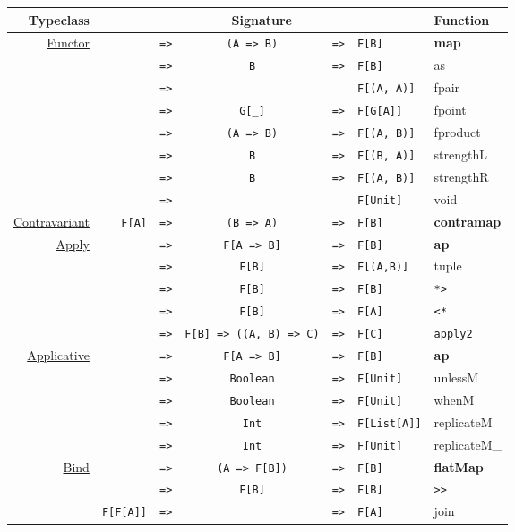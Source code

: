 \documentclass{tufte-handout}
\newcommand{\fa}{F[A]}
\newcommand{\fb}{F[B]}
\newcommand{\rarr}{\texttt{=>}}
\newcommand{\fTwo}[2]{\texttt{#1} & \rarr & & & \texttt{#2}}
\newcommand{\fThree}[3]{\texttt{#1} & \rarr & \texttt{#2} & \rarr & \texttt{#3}}
\newcommand{\sdocUrl}[1]{http://docs.typelevel.org/api/scalaz/stable/7.0.4/doc/\#scalaz.#1}
\newcommand{\sdocHref}[1]{\href{\sdocUrl{#1}}{#1}}
\begin{document}
\begin{table}[ht]
  \centering
  \selectfont
  \begin{tabular}{rrcclll}
    Typeclass & \multicolumn{5}{c}{Signature} & Function \\
    \midrule
    \multirow{8}{*}{\sdocHref{Functor}}
      & \fThree{\multirow{8}{*}{\fa}}{(A => B)}{\fb} & \textbf{map} \\
      & \fThree{}{B}{\fb} & as \\
      & \fTwo{}{F[(A, A)]} & fpair \\
      & \fThree{}{G[\_]}{F[G[A]]} & fpoint \\
      & \fThree{}{(A => B)}{F[(A, B)]} & fproduct \\
      & \fThree{}{B}{F[(B, A)]} & strengthL \\
      & \fThree{}{B}{F[(A, B)]} & strengthR \\
      & \fTwo{}{F[Unit]} & void \\[.5cm]
    \sdocHref{Contravariant} & \fThree{\fa}{(B => A)}{\fb} & \textbf{contramap} \\[.5cm]
    \multirow{5}{*}{\sdocHref{Apply}\footnotemark}
      & \fThree{\multirow{5}{*}{\fa}}{F[A => B]}{\fb} & \textbf{ap} \\
      & \fThree{}{\fb}{F[(A,B)]} & tuple \\
      & \fThree{}{\fb}{\fb} & \verb$*>$ \\
      & \fThree{}{\fb}{\fa} & \verb$<*$ \\
      & \fThree{}{F[B] => ((A, B) => C)}{F[C]} & \texttt{apply2}\footnotemark \\[.5cm]
    \multirow{5}{*}{\sdocHref{Applicative}}
      & \fThree{\multirow{5}{*}{\fa}}{F[A => B]}{\fb} & \textbf{ap} \\
      & \fThree{}{Boolean}{F[Unit]} & unlessM \\
      & \fThree{}{Boolean}{F[Unit]} & whenM \\
      & \fThree{}{Int}{F[List[A]]} & replicateM \\
      & \fThree{}{Int}{F[Unit]} & replicateM\_ \\[.5cm]
    \multirow{3}{*}{\sdocHref{Bind}}
      & \fThree{\multirow{2}{*}{\fa}}{(A => F[B])}{\fb} & \textbf{flatMap} \\
      & \fThree{}{\fb}{\fb} & \verb$>>$ \\
      & \fThree{F[F[A]]}{}{\fa} & join \\[.5cm]
  \end{tabular}
\end{table}
\end{document}
